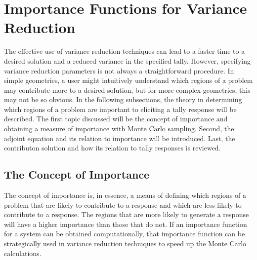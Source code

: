 \section{Importance Functions for Variance Reduction}
\label{sec:Importance}

The effective use of variance reduction techniques can lead to a faster time to
a desired solution and a reduced variance in the specified tally. However,
specifying variance reduction parameters is not always a straightforward
procedure. In simple geometries, a user might intuitively understand which
regions of a problem may contribute more to a desired solution, but for more
complex geometries, this may not be so obvious.
In the following subsections, the theory in determining which regions of a
problem are important to eliciting a tally response will be described.
The first topic discussed will be
the concept of importance and obtaining a measure of importance with
Monte Carlo sampling.
Second, the adjoint equation and its relation to importance will be introduced.
Last, the contributon solution and how its relation to tally responses is
reviewed.

\subsection{The Concept of Importance}
\label{sec:Importance}

The concept of importance is, in essence, a means of defining which regions of
a problem that are likely to contribute to a
response and which are less likely to contribute to a response. The regions
that are more likely to generate a response will have a
higher importance than those that do not.
If an importance
function for a system can be obtained computationally, that importance
function can be
strategically used in variance reduction techniques to speed up the Monte Carlo
calculations.

